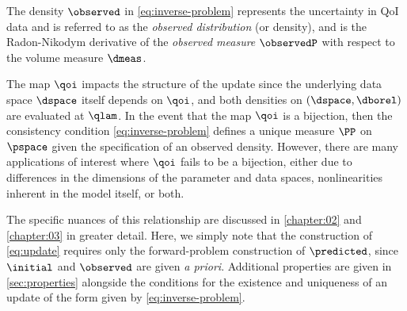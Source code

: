 \begin{defn}\label{defn:observed}
  The density $\observed$ in \eqref{eq:inverse-problem} represents the uncertainty in QoI data and is referred to as the \emph{observed distribution} (or density), and is the Radon-Nikodym derivative of the \emph{observed measure} $\observedP$ with respect to the volume measure $\dmeas$.
\end{defn}

The map $\qoi$ impacts the structure of the update since the underlying data space $\dspace$ itself depends on $\qoi$, and both densities on $(\dspace, \dborel)$ are evaluated at $\qlam$.
In the event that the map $\qoi$ is a bijection, then the consistency condition \eqref{eq:inverse-problem} defines a unique measure $\PP$ on $\pspace$ given the specification of an observed density.
However, there are many applications of interest where $\qoi$ fails to be a bijection, either due to differences in the dimensions of the parameter and data spaces, nonlinearities inherent in the model itself, or both.


The specific nuances of this relationship are discussed in \ref{chapter:02} and \ref{chapter:03} in greater detail.
Here, we simply note that the construction of \eqref{eq:update} requires only the forward-problem construction of $\predicted$, since $\initial$ and $\observed$ are given \emph{a priori}.
Additional properties are given in \ref{sec:properties} alongside the conditions for the existence and uniqueness of an update of the form given by \eqref{eq:inverse-problem}.
